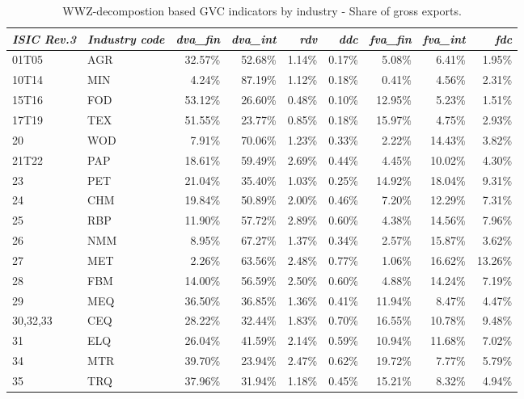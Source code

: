 \documentclass[a4paper,11pt]{article}
\begin{document}
\begin{table}[h]\small
  \centering
       \caption{WWZ-decompostion based GVC indicators by industry - Share of gross exports.}
           \hspace*{-1.5cm}
    \begin{tabular}{llrrrrrrr}
    \toprule
    \textit{ISIC Rev.3} & \textit{Industry code} & \textit{dva\_fin} & \textit{dva\_int} & \textit{rdv} & \textit{ddc} & \textit{fva\_fin} & \textit{fva\_int} & \textit{fdc} \\
    \midrule
     01T05 & AGR   & 32.57\% & 52.68\% & 1.14\% & 0.17\% & 5.08\% & 6.41\% & 1.95\% \\
    10T14 & MIN   & 4.24\% & 87.19\% & 1.12\% & 0.18\% & 0.41\% & 4.56\% & 2.31\% \\
    15T16 & FOD   & 53.12\% & 26.60\% & 0.48\% & 0.10\% & 12.95\% & 5.23\% & 1.51\% \\
    17T19 & TEX   & 51.55\% & 23.77\% & 0.85\% & 0.18\% & 15.97\% & 4.75\% & 2.93\% \\
    20    & WOD   & 7.91\% & 70.06\% & 1.23\% & 0.33\% & 2.22\% & 14.43\% & 3.82\% \\
    21T22 & PAP   & 18.61\% & 59.49\% & 2.69\% & 0.44\% & 4.45\% & 10.02\% & 4.30\% \\
    23    & PET   & 21.04\% & 35.40\% & 1.03\% & 0.25\% & 14.92\% & 18.04\% & 9.31\% \\
    24    & CHM   & 19.84\% & 50.89\% & 2.00\% & 0.46\% & 7.20\% & 12.29\% & 7.31\% \\
    25    & RBP   & 11.90\% & 57.72\% & 2.89\% & 0.60\% & 4.38\% & 14.56\% & 7.96\% \\
    26    & NMM   & 8.95\% & 67.27\% & 1.37\% & 0.34\% & 2.57\% & 15.87\% & 3.62\% \\
    27    & MET   & 2.26\% & 63.56\% & 2.48\% & 0.77\% & 1.06\% & 16.62\% & 13.26\% \\
    28    & FBM   & 14.00\% & 56.59\% & 2.50\% & 0.60\% & 4.88\% & 14.24\% & 7.19\% \\
    29    & MEQ   & 36.50\% & 36.85\% & 1.36\% & 0.41\% & 11.94\% & 8.47\% & 4.47\% \\
    30,32,33 & CEQ   & 28.22\% & 32.44\% & 1.83\% & 0.70\% & 16.55\% & 10.78\% & 9.48\% \\
    31    & ELQ   & 26.04\% & 41.59\% & 2.14\% & 0.59\% & 10.94\% & 11.68\% & 7.02\% \\
    34    & MTR   & 39.70\% & 23.94\% & 2.47\% & 0.62\% & 19.72\% & 7.77\% & 5.79\% \\
    35    & TRQ   & 37.96\% & 31.94\% & 1.18\% & 0.45\% & 15.21\% & 8.32\% & 4.94\% \\

\end{tabular}
\end{table}
\end{document}

